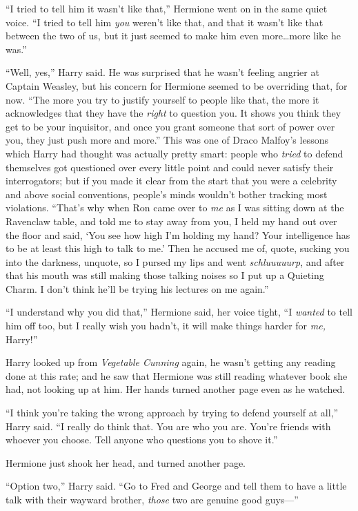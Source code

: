 “I tried to tell him it wasn’t like that,” Hermione went on in the same quiet voice. “I tried to tell him \emph{you} weren’t like that, and that it wasn’t like that between the two of us, but it just seemed to make him even more…more like he was.”

“Well, yes,” Harry said. He was surprised that he wasn’t feeling angrier at Captain Weasley, but his concern for Hermione seemed to be overriding that, for now. “The more you try to justify yourself to people like that, the more it acknowledges that they have the \emph{right} to question you. It shows you think they get to be your inquisitor, and once you grant someone that sort of power over you, they just push more and more.” This was one of Draco Malfoy’s lessons which Harry had thought was actually pretty smart: people who \emph{tried} to defend themselves got questioned over every little point and could never satisfy their interrogators; but if you made it clear from the start that you were a celebrity and above social conventions, people’s minds wouldn’t bother tracking most violations. “That’s why when Ron came over to \emph{me} as I was sitting down at the Ravenclaw table, and told me to stay away from you, I held my hand out over the floor and said, ‘You see how high I’m holding my hand? Your intelligence has to be at least this high to talk to me.’ Then he accused me of, quote, sucking you into the darkness, unquote, so I pursed my lips and went \emph{schluuuuurp}, and after that his mouth was still making those talking noises so I put up a Quieting Charm. I don’t think he’ll be trying his lectures on me again.”

“I understand why you did that,” Hermione said, her voice tight, “I \emph{wanted} to tell him off too, but I really wish you hadn’t, it will make things harder for \emph{me,} Harry!”

Harry looked up from \emph{Vegetable Cunning} again, he wasn’t getting any reading done at this rate; and he saw that Hermione was still reading whatever book she had, not looking up at him. Her hands turned another page even as he watched.

“I think you’re taking the wrong approach by trying to defend yourself at all,” Harry said. “I really do think that. You are who you are. You’re friends with whoever you choose. Tell anyone who questions you to shove it.”

Hermione just shook her head, and turned another page.

“Option two,” Harry said. “Go to Fred and George and tell them to have a little talk with their wayward brother, \emph{those} two are genuine good guys—”

